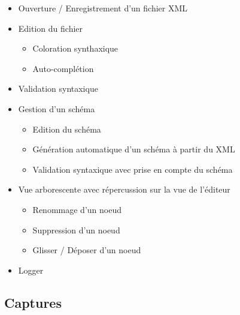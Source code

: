 \begin{itemize}
\item Ouverture / Enregistrement d'un fichier XML
\item Edition du fichier
  \begin{itemize}
  \item Coloration synthaxique
  \item Auto-complétion
  \end{itemize}
\item Validation syntaxique
\item Gestion d'un schéma
  \begin{itemize}
  \item Edition du schéma
  \item Génération automatique d'un schéma à partir du XML
  \item Validation syntaxique avec prise en compte du schéma
  \end{itemize}
\item Vue arborescente avec répercussion sur la vue de l'éditeur
  \begin{itemize}
  \item Renommage d'un noeud
  \item Suppression d'un noeud
  \item Glisser / Déposer d'un noeud
  \end{itemize}
\item Logger
\end{itemize}

\subsection{Captures}

